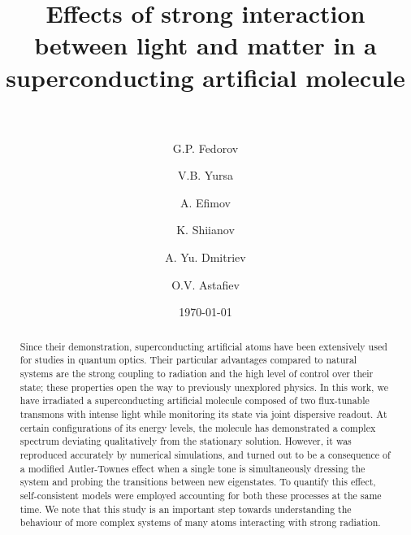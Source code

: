 \documentclass[%
 pra,
 amsmath,amssymb,
 reprint,%
]{revtex4-1}
\newcommand{\mytitile}{Effects of strong interaction between light and matter in a superconducting artificial molecule}
\begin{document}
	
	\title[\mytitile]{\mytitile\\~}
	
	\author{G.P. Fedorov}
	
	\author{V.B. Yursa}
	
	\author{A. Efimov}
	
	
	\author{K. Shiianov}


	\author{A. Yu. Dmitriev}

	\author{O.V. Astafiev}
	
	
	\date{\today}%
	
	
	\begin{abstract}
	Since their demonstration, superconducting artificial atoms have been extensively used for studies in quantum optics. Their particular advantages compared to natural systems are the strong coupling to radiation and the high level of control over their state; these properties open the way to previously unexplored physics. In this work, we have irradiated a superconducting artificial molecule composed of two flux-tunable transmons with intense light while monitoring its state via joint dispersive readout. At certain configurations of its energy levels, the molecule has demonstrated a complex spectrum deviating qualitatively from the stationary solution. However, it was reproduced accurately by numerical simulations, and turned out to be a consequence of a modified Autler-Townes effect when a single tone is simultaneously dressing the system and probing the transitions between new eigenstates. To quantify this effect, self-consistent models were employed accounting for both these processes at the same time. We note that this study is an important step towards understanding the behaviour of more complex systems of many atoms interacting with strong radiation.
	\end{abstract}
	
\end{document}
